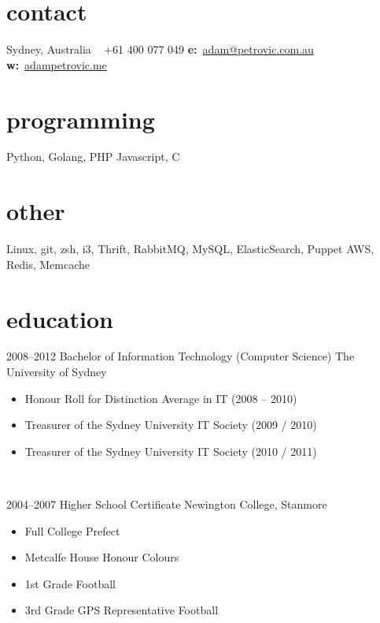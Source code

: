 \documentclass[]{friggeri-cv} %
\begin{document}


\begin{aside} %
\section{contact}
Sydney, Australia
~
+61 400 077 049
\textbf{e:}~\href{mailto:adam@petrovic.com.au}{adam@petrovic.com.au}
\textbf{w:}~\href{http://www.adampetrovic.me}{adampetrovic.me}
\section{programming}
Python, Golang, PHP
Javascript, C
\section{other}
Linux, git, zsh, i3, Thrift, RabbitMQ, MySQL, ElasticSearch, Puppet AWS, Redis, Memcache
\end{aside}


\section{education}

\begin{entrylist}
\entry
{2008--2012}
{Bachelor of Information Technology (Computer Science)}
{The University of Sydney}
{
    \begin{itemize}
        \item Honour Roll for Distinction Average in IT (2008 – 2010)
        \item Treasurer of the Sydney University IT Society (2009 / 2010)
        \item Treasurer of the Sydney University IT Society (2010 / 2011)
    \end{itemize}
    ~
}
\entry
{2004--2007}
{Higher School Certificate}
{Newington College, Stanmore}
{
    \begin{itemize}
        \item Full College Prefect
        \item Metcalfe House Honour Colours
        \item 1st Grade Football
        \item 3rd Grade GPS Representative Football
    \end{itemize}
}
\end{entrylist}
\end{document}
